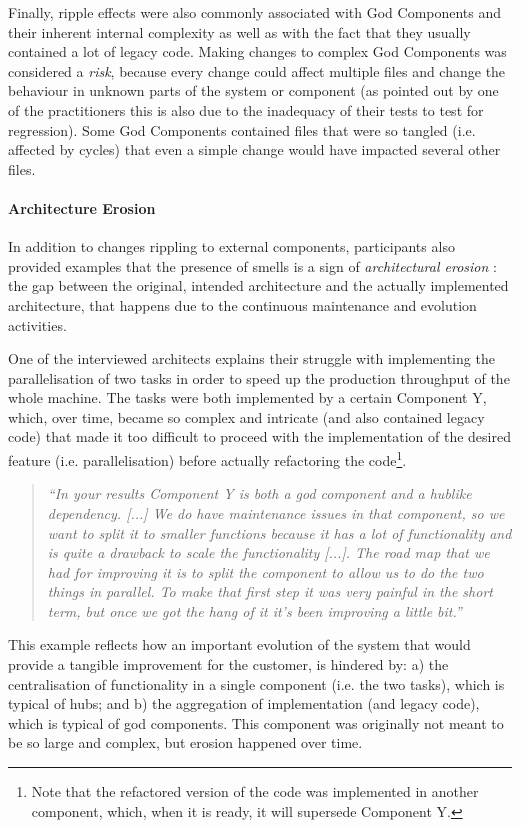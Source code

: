 Finally, ripple effects were also commonly associated with God Components and their inherent internal complexity as well as with the fact that they usually contained a lot of legacy code. Making changes to complex God Components was considered a \emph{risk}, because every change could affect multiple files and change the behaviour in unknown parts of the system or component (as pointed out by one of the practitioners this is also due to the inadequacy of their tests to test for regression).
Some God Components contained files that were so tangled (i.e. affected by cycles) that even a simple change would have impacted several other files.
 

\paragraph{Architecture Erosion}
In addition to changes rippling to external components, participants also provided examples that the presence of smells is a sign of \emph{architectural erosion} \cite{Perry1992}: the gap between the original, intended architecture and the actually implemented architecture, that happens due to the continuous maintenance and evolution activities.

One of the interviewed architects explains their struggle with implementing the parallelisation of two tasks in order to speed up the production throughput of the whole machine. 
The tasks were both implemented by a certain Component Y, which, over time, became so complex and intricate (and also contained legacy code) that made it too difficult to proceed with the implementation of the desired feature (i.e. parallelisation) before actually refactoring the code\footnote{Note that the refactored version of the code was implemented in another component, which, when it is ready, it will supersede Component Y.}.
\begin{quote}
    \emph{``In your results Component Y is both a god component and a hublike dependency. [...] We do have maintenance issues in that component, so we want to split it to smaller functions because it has a lot of functionality and is quite a drawback to scale the functionality [...]. The road map that we had for improving it is to split the component to allow us to do the two things in parallel.
    To make that first step it was very painful in the short term, but once we got the hang of it it’s been improving a little bit.''}
\end{quote}
This example reflects how an important evolution of the system that would provide a tangible improvement for the customer, is hindered by: a) the centralisation of functionality in a single component (i.e. the two tasks), which is typical of hubs; and b) the aggregation of implementation (and legacy code), which is typical of god components. This component was originally not meant to be so large and complex, but erosion happened over time.

